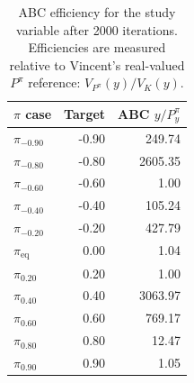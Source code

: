 \begin{table}[!htbp]
\centering
\small
\caption{ABC efficiency for the study variable after 2000 iterations. Efficiencies are measured relative to Vincent's real-valued \(P^\pi\) reference: \(V_{P^\pi}(y)/V_K(y)\).}
\label{tab:abc-y-efficiency-simple}
\begin{tabular}{lrr}
\toprule
\(\pi\) case & Target & ABC \(y/P^\pi_y\) \\
\midrule
\(\pi_{-0.90}\) & -0.90 & 249.74 \\
\(\pi_{-0.80}\) & -0.80 & 2605.35 \\
\(\pi_{-0.60}\) & -0.60 & 1.00 \\
\(\pi_{-0.40}\) & -0.40 & 105.24 \\
\(\pi_{-0.20}\) & -0.20 & 427.79 \\
\(\pi_{\mathrm{eq}}\) & 0.00 & 1.04 \\
\(\pi_{0.20}\) & 0.20 & 1.00 \\
\(\pi_{0.40}\) & 0.40 & 3063.97 \\
\(\pi_{0.60}\) & 0.60 & 769.17 \\
\(\pi_{0.80}\) & 0.80 & 12.47 \\
\(\pi_{0.90}\) & 0.90 & 1.05 \\
\bottomrule
\end{tabular}
\end{table}
